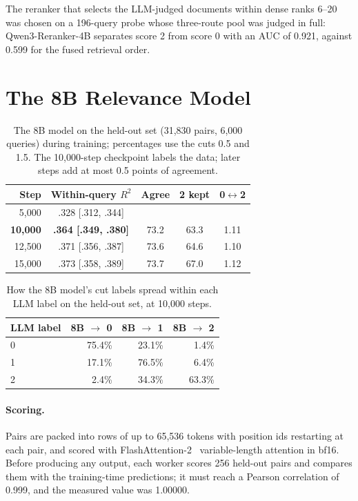 The reranker that selects the LLM-judged documents within dense ranks 6--20 was chosen on a 196-query probe whose three-route pool was judged in full: Qwen3-Reranker-4B separates score 2 from score 0 with an AUC of 0.921, against 0.599 for the fused retrieval order.

\section{The 8B Relevance Model}
\label{app:8b}

\begin{table}[h]
\centering
\small
\setlength{\tabcolsep}{4pt}
\begin{tabular}{rcccc}
\toprule
Step & Within-query $R^2$ & Agree & 2 kept & 0$\leftrightarrow$2 \\
\midrule
5,000 & .328 [.312, .344] & & & \\
\textbf{10,000} & \textbf{.364 [.349, .380]} & 73.2 & 63.3 & 1.11 \\
12,500 & .371 [.356, .387] & 73.6 & 64.6 & 1.10 \\
15,000 & .373 [.358, .389] & 73.7 & 67.0 & 1.12 \\
\bottomrule
\end{tabular}
\caption{The 8B model on the held-out set (31,830 pairs, 6,000 queries) during training; percentages use the cuts 0.5 and 1.5. The 10,000-step checkpoint labels the data; later steps add at most 0.5 points of agreement.}
\label{tab:8b-curve}
\end{table}

\begin{table}[h]
\centering
\small
\begin{tabular}{lrrr}
\toprule
LLM label & 8B $\rightarrow$ 0 & 8B $\rightarrow$ 1 & 8B $\rightarrow$ 2 \\
\midrule
0 & 75.4\% & 23.1\% & 1.4\% \\
1 & 17.1\% & 76.5\% & 6.4\% \\
2 & 2.4\% & 34.3\% & 63.3\% \\
\bottomrule
\end{tabular}
\caption{How the 8B model's cut labels spread within each LLM label on the held-out set, at 10,000 steps.}
\label{tab:8b-confusion}
\end{table}

\paragraph{Scoring.} Pairs are packed into rows of up to 65,536 tokens with position ids restarting at each pair, and scored with FlashAttention-2~\citep{dao2024flashattention2} variable-length attention in bf16. Before producing any output, each worker scores 256 held-out pairs and compares them with the training-time predictions; it must reach a Pearson correlation of 0.999, and the measured value was 1.00000.

